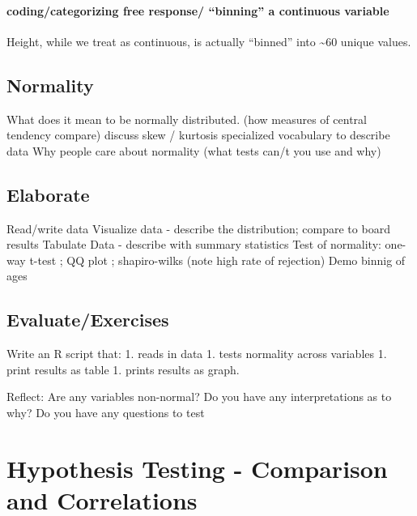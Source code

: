 \documentclass[
]{book}
\begin{document}
\hypertarget{codingcategorizing-free-response-binning-a-continuous-variable}{%
\subsubsection{coding/categorizing free response/ ``binning'' a continuous variable}\label{codingcategorizing-free-response-binning-a-continuous-variable}}

Height, while we treat as continuous, is actually ``binned'' into \textasciitilde60 unique values.

\hypertarget{normality}{%
\section{Normality}\label{normality}}

What does it mean to be normally distributed. (how measures of central tendency compare)
discuss skew / kurtosis
specialized vocabulary to describe data
Why people care about normality (what tests can/t you use and why)

\hypertarget{elaborate-2}{%
\section{Elaborate}\label{elaborate-2}}

Read/write data
Visualize data - describe the distribution; compare to board results
Tabulate Data - describe with summary statistics
Test of normality: one-way t-test ; QQ plot ; shapiro-wilks (note high rate of rejection)
Demo binnig of ages

\hypertarget{evaluateexercises-2}{%
\section{Evaluate/Exercises}\label{evaluateexercises-2}}

Write an R script that:
1. reads in data
1. tests normality across variables
1. print results as table
1. prints results as graph.

Reflect: Are any variables non-normal? Do you have any interpretations as to why?
Do you have any questions to test

\hypertarget{hypothesis-testing---comparison-and-correlations}{%
\chapter{Hypothesis Testing - Comparison and Correlations}\label{hypothesis-testing---comparison-and-correlations}}
\end{document}
